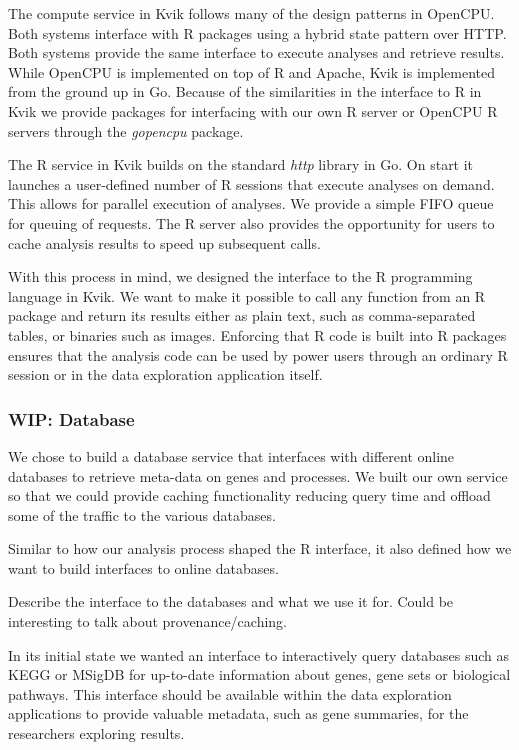 The compute service in Kvik follows many of the design patterns in
OpenCPU. Both systems interface with R packages using a hybrid state pattern
over HTTP. Both systems provide the same interface to execute analyses and
retrieve results.  While OpenCPU is implemented on top of R and Apache, Kvik is
implemented from the ground up in Go. Because of the similarities in the
interface to R in Kvik we provide packages for interfacing with our own R server
or OpenCPU R servers through the \emph{gopencpu} package. 

The R service in Kvik builds on the standard \emph{http} library in Go. On start
it launches a user-defined number of R sessions that execute analyses on demand.
This allows for parallel execution of analyses. We provide a simple FIFO queue
for queuing of requests. The R server also provides the opportunity for users to
cache analysis results to speed up subsequent calls. 


With this process in mind, we designed the interface to the R programming
language in Kvik. We want to make it possible to call any function from an R
package and return its results either as plain text, such as comma-separated
tables, or binaries such as images. Enforcing that R code is built into R
packages ensures that the analysis code can be used by power users through an
ordinary R session or in the data exploration application itself. 



\subsubsection*{WIP: Database} 
We chose to build a database service that interfaces with different online
databases to retrieve meta-data on genes and processes. We built our own service
so that we could provide caching functionality reducing query time and
offload some of the traffic to the various databases. 


Similar to how our analysis process shaped the R interface, it also defined how
we want to build interfaces to online databases. 

Describe the interface to the databases and what we use it for. Could be
interesting to talk about provenance/caching.



In its initial state we wanted an interface to interactively query databases
such as KEGG or MSigDB for up-to-date information about genes, gene sets or
biological pathways. This interface should be available within the data
exploration applications to provide valuable metadata, such as gene summaries,
for the researchers exploring results.  

